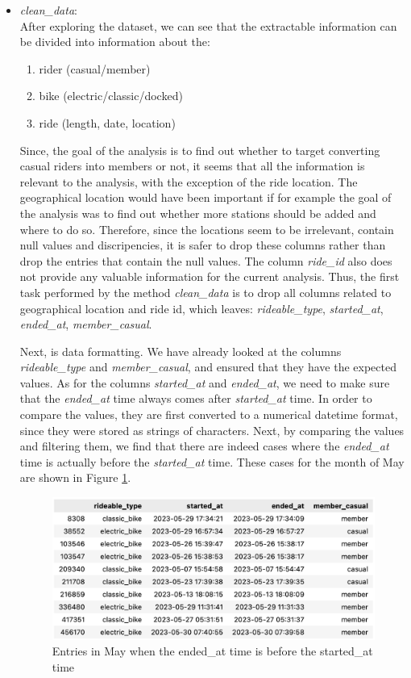 \documentclass[12pt]{article}
\begin{document}
\begin{itemize}
	\item \textit{clean\_data}:\\
	After exploring the dataset, we can see that the extractable information can be divided into information about the:
	\begin{enumerate} 
	\item rider (casual/member)
	\item bike (electric/classic/docked)
	\item ride (length, date, location)
	\end{enumerate}
Since, the goal of the analysis is to find out whether to target converting casual riders into members or not, it seems that all the information is relevant to the analysis, with the exception of the ride location. The geographical location would have been important if for example the goal of the analysis was to find out whether more stations should be added and where to do so. Therefore, since the locations seem to be irrelevant, contain null values and discripencies, it is safer to drop these columns rather than drop the entries that contain the null values. The column \textit{ride\_id} also does not provide any valuable information for the current analysis. Thus, the first task performed by the method \textit{clean\_data} is to drop all columns related to geographical location and ride id, which leaves: \textit{rideable\_type}, \textit{started\_at}, \textit{ended\_at}, \textit{member\_casual}. 


Next, is data formatting. We have already looked at the columns \textit{rideable\_type} and \textit{member\_casual}, and ensured that they have the expected values. As for the columns \textit{started\_at} and \textit{ended\_at}, we need to make sure that the \textit{ended\_at} time always comes after \textit{started\_at} time. In order to compare the values, they are first converted to a numerical datetime format, since they were stored as strings of characters. Next, by comparing the values and filtering them, we find that there are indeed cases where the \textit{ended\_at} time is actually before the \textit{started\_at} time. These cases for the month of May are shown in Figure \ref{fig8}.

	\begin{figure}[h]
	\centering
	\includegraphics[scale=0.56]{imgNEG.png}
	\caption{Entries in May when the ended\_at time is before the started\_at time}
	\label{fig8}
	\end{figure}


\end{itemize}
\end{document}
